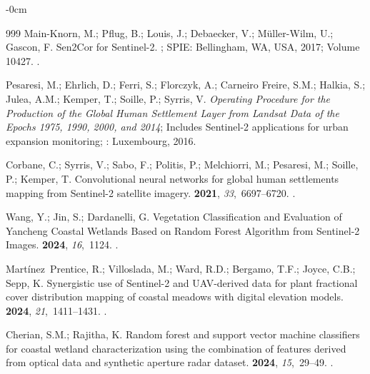 \documentclass[coasts,article,accept,pdftex,moreauthors]{Definitions/mdpi}
\begin{document}
\begin{adjustwidth}{-\extralength}{0cm}
\begin{thebibliography}{999}
Main-Knorn, M.; Pflug, B.; Louis, J.; Debaecker, V.; Müller-Wilm, U.; Gascon,
  F.
\newblock Sen2Cor for Sentinel-2.
; SPIE: Bellingham, WA, USA, {2017}; {Volume 10427}.
.

Pesaresi, M.; Ehrlich, D.;  Ferri, S.; Florczyk, A.; Carneiro Freire, S.M.; Halkia, S.; Julea, A.M.; Kemper, T.; Soille, P.; Syrris, V.
\newblock \textit{Operating Procedure for the Production of the Global Human Settlement
  Layer from Landsat Data of the Epochs 1975, 1990, 2000, and 2014}; Includes Sentinel-2 applications for urban expansion monitoring; 
: Luxembourg, {2016}.


Corbane, C.; Syrris, V.; Sabo, F.; Politis, P.; Melchiorri, M.; Pesaresi, M.; Soille, P.; Kemper, T.
\newblock Convolutional neural networks for global human settlements mapping
  from {Sentinel-2} satellite imagery.
 {\bf 2021}, {\em 33},~6697--6720.
.

Wang, Y.; Jin, S.; Dardanelli, G.
\newblock Vegetation Classification and Evaluation of {Yancheng} Coastal
  Wetlands Based on Random Forest Algorithm from {Sentinel-2} Images.
 {\bf 2024}, {\em 16},~1124.
.

Mart{\'i}nez~Prentice, R.; Villoslada, M.; Ward, R.D.; Bergamo, T.F.; Joyce,
  C.B.; Sepp, K.
\newblock Synergistic use of {Sentinel-2} and {UAV}-derived data for plant
  fractional cover distribution mapping of coastal meadows with digital
  elevation models.
 {\bf 2024}, {\em 21},~1411--1431.
.

Cherian, S.M.; Rajitha, K.
\newblock Random forest and support vector machine classifiers for coastal
  wetland characterization using the combination of features derived from
  optical data and synthetic aperture radar dataset.
 {\bf 2024}, {\em
  15},~29--49.
.


\end{thebibliography}
\end{adjustwidth}
\end{document}

